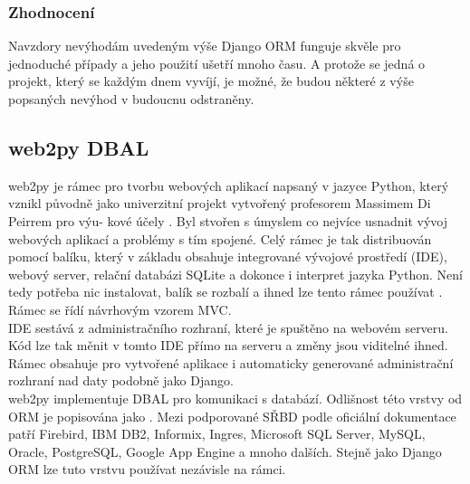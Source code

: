 \documentclass[ing,male,java,dept456]{diploma}						%
\begin{document}
\subsubsection{Zhodnocení}
Navzdory nevýhodám uvedeným výše Django ORM funguje skvěle pro jednoduché případy a jeho použití ušetří mnoho času. A protože se jedná o projekt, který se každým dnem vyvíjí, je možné, že budou některé z výše popsaných nevýhod v budoucnu odstraněny.

\subsection{web2py DBAL}

web2py je rámec pro tvorbu webových aplikací napsaný v jazyce Python, který vznikl původně jako univerzitní projekt vytvořený profesorem Massimem Di Peirrem pro výu- kové účely \cite{wikiw2p}. Byl stvořen s úmyslem co nejvíce usnadnit vývoj webových aplikací a problémy s tím spojené. Celý rámec je tak distribuován pomocí balíku, který v základu obsahuje integrované vývojové prostředí (IDE), webový server, relační databázi SQLite a dokonce i interpret jazyka Python. Není tedy potřeba nic instalovat, balík se rozbalí a ihned lze tento rámec používat \cite{web2py}. Rámec se řídí návrhovým vzorem MVC. \\
IDE sestává z administračního rozhraní, které je spuštěno na webovém serveru. Kód lze tak měnit v tomto IDE přímo na serveru a změny jsou viditelné ihned. Rámec obsahuje pro vytvořené aplikace i automaticky generované administrační rozhraní nad daty podobně jako Django. \\
web2py implementuje DBAL pro komunikaci s databází. Odlišnost této vrstvy od ORM je popisována jako  \cite{wikiw2p}. Mezi podporované SŘBD podle oficiální dokumentace patří Firebird, IBM DB2, Informix, Ingres, Microsoft SQL Server, MySQL, Oracle, PostgreSQL, Google App Engine a mnoho dalších. Stejně jako Django ORM lze tuto vrstvu používat nezávisle na rámci.
\end{document}

